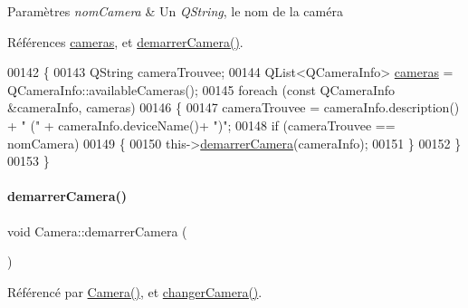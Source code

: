 \begin{DoxyParams}{Paramètres}
{\em nom\+Camera} & Un {\itshape Q\+String}, le nom de la caméra \\
\hline
\end{DoxyParams}


Références \hyperlink{class_camera_a3bea5177e857533a53cb94135bee8c6b}{cameras}, et \hyperlink{class_camera_a181773c87c3deaea9fa9844f8ac294e3}{demarrer\+Camera()}.


\begin{DoxyCode}
00142 \{
00143     QString cameraTrouvee;
00144     QList<QCameraInfo> \hyperlink{class_camera_a3bea5177e857533a53cb94135bee8c6b}{cameras} = QCameraInfo::availableCameras();
00145     \textcolor{keywordflow}{foreach} (\textcolor{keyword}{const} QCameraInfo &cameraInfo, cameras)
00146     \{
00147         cameraTrouvee = cameraInfo.description() + \textcolor{stringliteral}{" ("} + cameraInfo.deviceName()+ \textcolor{stringliteral}{")"};
00148         \textcolor{keywordflow}{if} (cameraTrouvee == nomCamera)
00149         \{
00150             this->\hyperlink{class_camera_a181773c87c3deaea9fa9844f8ac294e3}{demarrerCamera}(cameraInfo);
00151         \}
00152     \}
00153 \}
\end{DoxyCode}
\mbox{\label{class_camera_a181773c87c3deaea9fa9844f8ac294e3}} 
\paragraph{\texorpdfstring{demarrer\+Camera()}{demarrerCamera()}\hspace{0.1cm}{\footnotesize\ttfamily [1/2]}}
{\footnotesize\ttfamily void Camera\+::demarrer\+Camera (\begin{DoxyParamCaption}{ }\end{DoxyParamCaption})\hspace{0.3cm}{\ttfamily [private]}}



Référencé par \hyperlink{class_camera_ae3aa4afd7a3d9ddc2bf710bc74dc293e}{Camera()}, et \hyperlink{class_camera_a82a0dd06f1802dc0ec0ea8ff6fcbd231}{changer\+Camera()}.

\mbox{\label{class_camera_a7eb23e1a5fe67c61f36b8a97ff1f882c}} 
